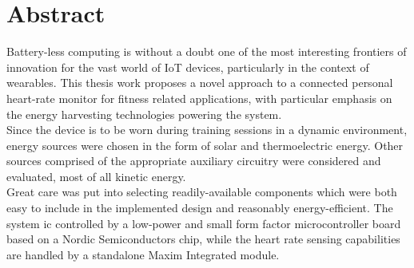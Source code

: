 \chapter*{Abstract}
\label{cha:abtract}

Battery-less computing is without a doubt one of the most interesting frontiers
of innovation for the vast world of IoT devices, particularly in the context of wearables.
This thesis work proposes a novel approach to a connected personal heart-rate
monitor for fitness related applications, with particular emphasis on the energy
harvesting technologies powering the system.\\ Since the device is to be worn during
training sessions in a dynamic environment, energy sources were chosen in the
form of solar and thermoelectric energy. Other sources comprised of the appropriate
auxiliary circuitry were considered and evaluated, most of all kinetic energy. \\
Great care was put into selecting readily-available components which were both easy
to include in the implemented design and reasonably energy-efficient. The system
ic controlled by a low-power and small form factor microcontroller board based
on a Nordic Semiconductors chip, while the heart rate sensing capabilities are handled
by a standalone Maxim Integrated module.
